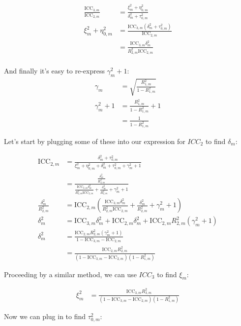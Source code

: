 \documentclass[12pt]{article}
\begin{document}
\begin{align*}
\frac{\text{ICC}_{3,m}}{\text{ICC}_{2,m}} &= \frac{\xi^2_m + \eta_{0,m}^2}{\delta_m^2  + \tau_{0,m}^2}\\
\xi^2_m + \eta_{0,m}^2 &= \frac{\text{ICC}_{3,m}(\delta_m^2  + \tau_{0,m}^2)}{\text{ICC}_{2,m}}\\
&= \frac{\text{ICC}_{3,m}\delta_m^2}{R_{2,m}^2\text{ICC}_{2,m}}\\
\end{align*}

And finally it's easy to re-express $\gamma_m^2 + 1$:
\begin{align*}
\gamma_m &= \sqrt{\frac{R_{1,m}^2}{1 - R_{1,m}^2}}\\
\gamma_m^2 + 1 &= \frac{R_{1,m}^2}{1 - R_{1,m}^2} + 1\\
&= \frac{1}{1 - R_{1,m}^2}
\end{align*}


Let's start by plugging some of these into our expression for $ICC_2$ to find $\delta_m$:

\begin{align*}
\text{ICC}_{2,m} &= \frac{\delta_m^2  + \tau_{0,m}^2}{\xi_m^2 +  \eta^2_{0,m} + \delta_m^2  + \tau^2_{0,m} + \gamma_m^2 + 1}\\
&= \frac{\frac{\delta_m^2}{R_{2,m}^2}}{\frac{\text{ICC}_{3,m}\delta_m^2}{R_{2,m}^2\text{ICC}_{2,m}} + \frac{\delta_m^2}{R_{2,m}^2} + \gamma_m^2 + 1}\\
\frac{\delta_m^2}{R_{2,m}^2} &= \text{ICC}_{2,m} \left(\frac{\text{ICC}_{3,m}\delta_m^2}{R_{2,m}^2\text{ICC}_{2,m}} + \frac{\delta_m^2}{R_{2,m}^2} + \gamma_m^2 + 1\right) \\
\delta_m^2 &=  \text{ICC}_{3,m}\delta_m^2 + \text{ICC}_{2,m} \delta_m^2 + \text{ICC}_{2,m}R_{2,m}^2(\gamma_m^2 + 1)\\
\delta_m^2 &= \frac{\text{ICC}_{2,m}R_{2,m}^2(\gamma_m^2 + 1)}{1 - \text{ICC}_{3,m}- \text{ICC}_{2,m}}\\
&= \frac{\text{ICC}_{2,m}R_{2,m}^2}{(1 - \text{ICC}_{3,m}- \text{ICC}_{2,m})(1-R_{1,m}^2)}
\end{align*}


Proceeding by a similar method, we can use $ICC_3$ to find $\xi_m$:

\begin{align*}
\xi_m^2 &= \frac{\text{ICC}_{3,m}R_{3,m}^2}{(1 - \text{ICC}_{3,m}- \text{ICC}_{2,m})(1-R_{1,m}^2)}
\end{align*}

Now we can plug in to find $\tau^2_{0,m}$:
\end{document}
